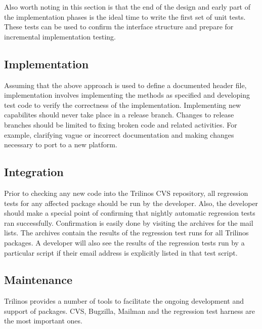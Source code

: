 \documentclass[12pt,relax]{TrilinosDevGuide}
\begin{document}
Also worth noting in this section is that the end of the design and
early part of the implementation phases is the ideal time to
write the first set of unit tests.  These tests can be used to confirm
the interface structure and prepare for incremental implementation testing.

\subsection{Implementation}
Assuming that the above approach is used to define a documented header
file, implementation involves implementing the methods as specified
and developing test code to verify the correctness of the implementation.
Implementing new capabilites should never take place in a release branch.  
Changes to release branches should be limited to fixing broken code and 
related activities.  For example, clarifying vague or incorrect documentation 
and making changes necessary to port to a new platform.

\subsection{Integration}
Prior to checking any new code into the Trilinos CVS repository, all
regression tests for any affected package should be run by the
developer.  Also, the developer should make a special point of
confirming that nightly automatic regression tests ran successfully.
Confirmation is easily done by visiting the archives for the 
 mail lists.  
The archives contain the results of the regression test runs for all 
Trilinos packages.  A developer will also see the results of 
the regression tests run by a particular script if their 
email address is explicitly listed in that test script.

\subsection{Maintenance}
Trilinos provides a number of tools to facilitate the ongoing
development and support of packages.  CVS, Bugzilla, Mailman and the
regression test harness are the most important ones.
\end{document}
